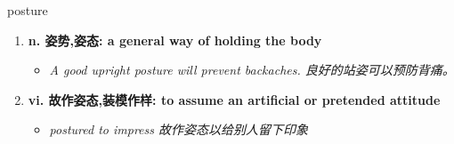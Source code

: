 
\begin{frame}
{\huge posture}
\begin{center}
\begin{enumerate}\Large
  \item \textbf{n. 姿势,姿态: a general way of holding the body}
  \begin{itemize}
    \item \em{\Large{A good upright posture will prevent backaches. 良好的站姿可以预防背痛。}}
  \end{itemize}
  \item \textbf{vi. 故作姿态,装模作样: to assume an artificial or pretended attitude}
  \begin{itemize}
    \item \em{\Large{postured to impress 故作姿态以给别人留下印象}}
  \end{itemize}
\end{enumerate}
\end{center}
\end{frame}

